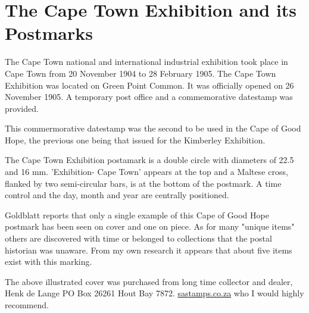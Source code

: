 \chapter{The Cape Town Exhibition and its Postmarks}



The Cape Town national and international industrial exhibition took place 
in Cape Town from 20 November 1904 to 28 February 1905. The Cape Town 
Exhibition was located on Green Point Common. It was officially opened 
on 26 November 1905. A temporary post office and a commemorative 
datestamp was provided.

This commermorative datestamp was the second to be used in the Cape of 
Good Hope, the previous one being that issued for the Kimberley Exhibition.

 
 
The Cape Town Exhibition postamark is a double circle with diameters 
of 22.5 and 16 mm. 'Exhibition- Cape Town' appears at the top and a 
Maltese cross, flanked by two semi-circular bars, is at the bottom 
of the postmark. A time control and the day, month and year are 
centrally positioned.

Goldblatt reports that only a single example of this Cape of Good Hope 
postmark has been seen on cover and one on piece. As for many 
"unique items" others are discovered with time or belonged to 
collections that the postal historian was unaware. From my own 
research it appears that about five items exist with this marking.

The above illustrated cover was purchased from long time collector and dealer,
Henk de Lange PO Box 26261 Hout Bay 7872. \href{http://www.sastamps.co.za}{sastamps.co.za}
who I would highly recommend.                  